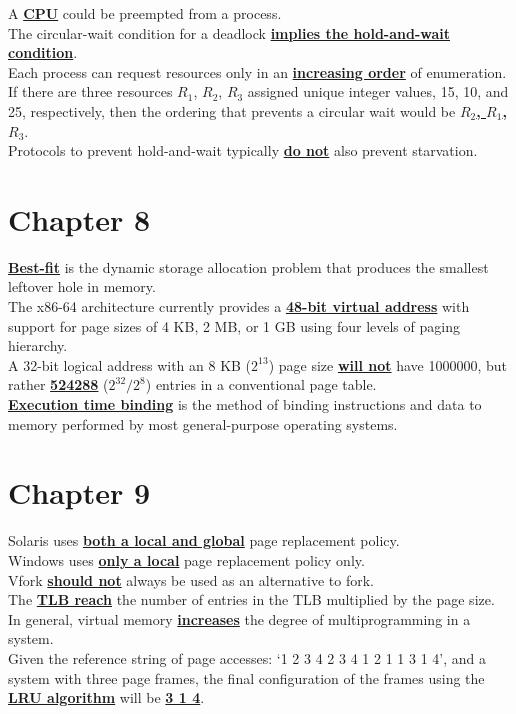 \documentclass[10pt]{article}
\newcommand{\qw}[1]{\textbf{\ul{#1}}}
\begin{document}
A \qw{CPU} could be preempted from a process.\\[2mm]
The circular-wait condition for a deadlock \qw{implies the hold-and-wait condition}.\\[2mm]
Each process can request resources only in an \qw{increasing order} of enumeration. If there are three resources $R_1$, $R_2$, $R_3$ assigned unique integer values, 15, 10, and 25, respectively, then the ordering that prevents a circular wait would be \qw{$R_2$, $R_1$, $R_3$}.\\[2mm]
Protocols to prevent hold-and-wait typically \qw{do not} also prevent starvation.\\[2mm]


\newpage
\section*{\centering Chapter 8}
\qw{Best-fit} is the dynamic storage allocation problem that produces the smallest leftover hole in memory.\\[2mm]
The x86-64 architecture currently provides a \qw{48-bit virtual address} with support for page sizes of 4 KB, 2 MB, or 1 GB using four levels of paging hierarchy.\\[2mm]
A 32-bit logical address with an 8 KB ($2^13$) page size \qw{will not} have 1000000, but rather \qw{524288} ($2^{32}/2^8$) entries in a conventional page table.\\[2mm]
\qw{Execution time binding} is the method of binding instructions and data to memory performed by most general-purpose operating systems.\\[2mm]

\newpage
\section*{\centering Chapter 9}
Solaris uses \qw{both a local and global} page replacement policy.\\[2mm]
Windows uses \qw{only a local} page replacement policy only.\\[2mm]
Vfork \qw{should not} always be used as an alternative to fork.\\[2mm]
The \qw{TLB reach} the number of entries in the TLB multiplied by the page size.\\[2mm]
In general, virtual memory \qw{increases} the degree of multiprogramming in a system.\\[2mm]
Given the reference string of page accesses: `1 2 3 4 2 3 4 1 2 1 1 3 1 4', and a system with three page frames, the final configuration of the frames using the \qw{LRU algorithm} will be \qw{3 1 4}.\\[2mm]
\end{document}
